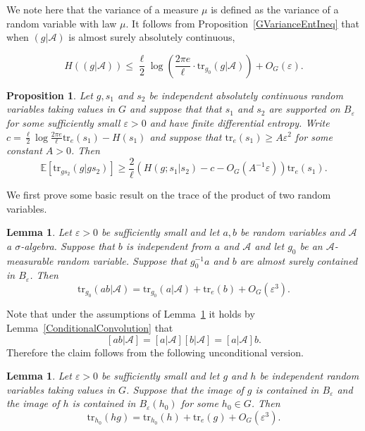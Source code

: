 \documentclass[10pt, english,oneside,reqno]{amsart}
\theoremstyle{plain}
\newtheorem{proposition}[theorem]{Proposition}
\newtheorem{lemma}[theorem]{Lemma}
\theoremstyle{remark}
\numberwithin{equation}{section}
\numberwithin{figure}{section}
\newcommand{\eps}{\varepsilon}
\newcommand{\tr}{\mathrm{tr}}
\begin{document}
We note here that the variance of a measure $\mu$ is defined as the variance of a random variable with law $\mu$. It follows from Proposition~\ref{GVarianceEntIneq} that when $(g|\mathscr{A})$ is almost surely absolutely continuous, 

\begin{equation}\label{ConditionalGVarianceEntIneq}
    H((g|\mathscr{A})) \leq \frac{\ell}{2} \log\left(  \frac{2\pi e}{\ell} \cdot \tr_{g_0}(g|\mathscr{A}) \right) + O_G(\eps).
\end{equation}

\begin{proposition}\label{AbstractEntropyIncrease}
    Let $g,s_1$ and $s_2$ be independent absolutely continuous random variables taking values in $G$ and suppose that that $s_1$ and $s_2$ are supported on $B_{\eps}$ for some sufficiently small $\eps > 0$ and have finite differential entropy. Write $c = \frac{\ell}{2} \log \frac{2\pi e}{\ell} \tr_e(s_1) - H(s_1)$ and suppose that $\tr_e(s_1) \geq A\eps^2$ for some constant $A > 0$. Then $$\mathbb{E}[\tr_{gs_2}(g|gs_2)] \geq \frac{2}{\ell}(H(g; s_1|s_2) - c - O_G(A^{-1}\eps))\tr_e(s_1).$$ 
\end{proposition}

We first prove some basic result on the trace of the product of two random variables. 

\begin{lemma}\label{GVarProdBound}
    Let $\eps > 0$ be sufficiently small and let $a,b$ be random variables and $\mathscr{A}$ a $\sigma$-algebra. Suppose that $b$ is independent from $a$ and $\mathscr{A}$ and let $g_0$ be an $\mathscr{A}$-measurable random variable. Suppose that $g_0^{-1}a$ and $b$ are almost surely contained in $B_{\eps}$. Then $$\tr_{g_0}(ab|\mathscr{A}) = \tr_{g_0}(a|\mathscr{A}) + \tr_{e}(b) + O_G(\eps^3).$$
\end{lemma} 

Note that under the assumptions of Lemma~\ref{GVarProdBound} it holds by Lemma~\ref{ConditionalConvolution} that $$[ab|\mathscr{A}] = [a|\mathscr{A}][b|\mathscr{A}] = [a|\mathscr{A}]b.$$ Therefore the claim follows from the following unconditional version.


\begin{lemma}
    Let $\eps > 0$ be sufficiently small and let $g$ and $h$ be independent random variables taking values in $G$. Suppose that the image of $g$ is contained in $B_{\eps}$ and the image of $h$ is contained in $B_{\eps}(h_0)$ for some $h_0 \in G$. Then $$\tr_{h_0}(hg) = \tr_{h_0}(h) + \tr_e(g) + O_G(\eps^3).$$
\end{lemma}
\end{document}
